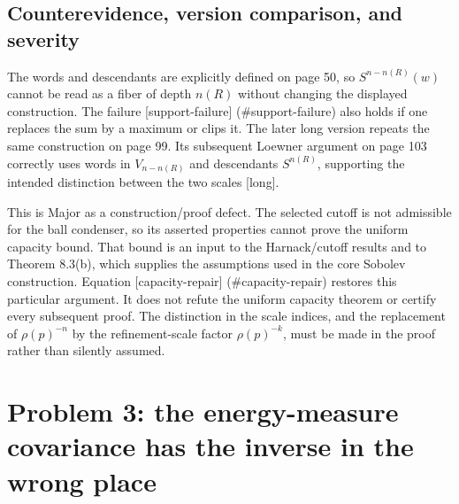 \documentclass[10pt]{article}
\begin{document}
\subsection*{Counterevidence, version comparison, and severity}
The words and descendants are explicitly defined on page 50, so \(S^{n-n(R)}(w)\) cannot be read as a fiber of depth \(n(R)\) without changing the displayed construction. The failure [support-failure] (\#support-failure) also holds if one replaces the sum by a maximum or clips it. The later long version repeats the same construction on page 99. Its subsequent Loewner argument on page 103 correctly uses words in \(V_{n-n(R)}\) and descendants \(S^{n(R)}\), supporting the intended distinction between the two scales [long].\par
This is Major as a construction/proof defect. The selected cutoff is not admissible for the ball condenser, so its asserted properties cannot prove the uniform capacity bound. That bound is an input to the Harnack/cutoff results and to Theorem 8.3(b), which supplies the assumptions used in the core Sobolev construction. Equation [capacity-repair] (\#capacity-repair) restores this particular argument. It does not refute the uniform capacity theorem or certify every subsequent proof. The distinction in the scale indices, and the replacement of \(\rho(p)^{-n}\) by the refinement-scale factor \(\rho(p)^{-k}\), must be made in the proof rather than silently assumed.\par
\section*{Problem 3: the energy-measure covariance has the inverse in the wrong place}
\end{document}
